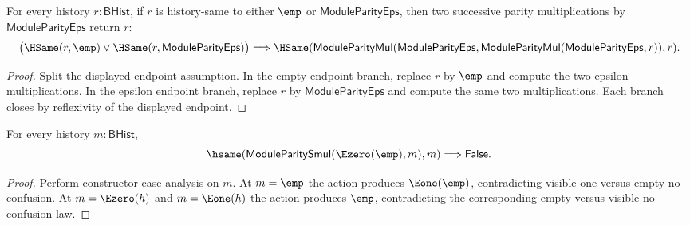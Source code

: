 \begin{theorem}
\label{thm:module-parity-mul-epsilon-boolean-orbit-involutive}
For every history $r:\mathsf{BHist}$, if $r$ is history-same to either
$\emp$ or $\mathsf{ModuleParityEps}$, then two successive parity
multiplications by $\mathsf{ModuleParityEps}$ return $r$:
$$
\bigl(\HSame(r,\emp)\lor \HSame(r,\mathsf{ModuleParityEps})\bigr)
\Longrightarrow
\HSame(\mathsf{ModuleParityMul}(\mathsf{ModuleParityEps},
  \mathsf{ModuleParityMul}(\mathsf{ModuleParityEps},r)),r).
$$
\end{theorem}
\begin{proof}
Split the displayed endpoint assumption. In the empty endpoint branch, replace
$r$ by $\emp$ and compute the two epsilon multiplications. In the epsilon
endpoint branch, replace $r$ by $\mathsf{ModuleParityEps}$ and compute the same
two multiplications. Each branch closes by reflexivity of the displayed
endpoint.
\end{proof}

\begin{theorem}
\label{thm:module-parity-smul-e0-empty-no-fixed-point}
For every history $m:\mathsf{BHist}$,
$$
\hsame(\mathsf{ModuleParitySmul}(\Ezero(\emp),m),m)
\Longrightarrow
\mathsf{False}.
$$
\end{theorem}
\begin{proof}
Perform constructor case analysis on $m$. At $m=\emp$ the action produces
$\Eone(\emp)$, contradicting visible-one versus empty no-confusion. At
$m=\Ezero(h)$ and $m=\Eone(h)$ the action produces $\emp$, contradicting the
corresponding empty versus visible no-confusion law.
\end{proof}

